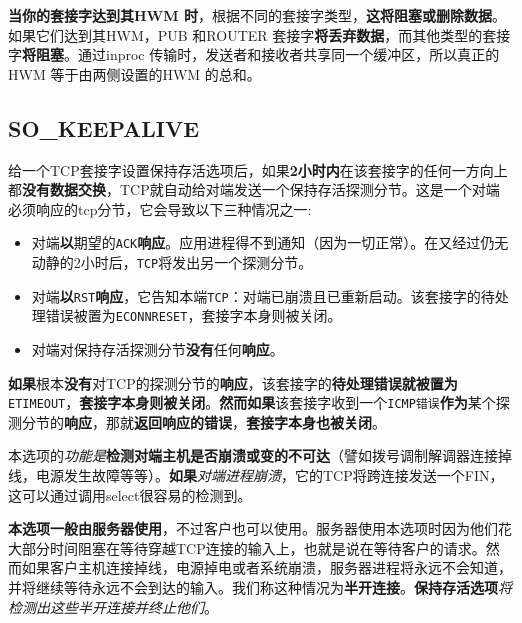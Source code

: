 \documentclass[UTF8,a4paper,8pt]{ctexbook}
\begin{document}
			\textbf{当你的套接字达到其HWM 时}，根据不同的套接字类型，\textbf{这将阻塞或删除数据}。如果它们达到其HWM，PUB 和ROUTER 套接字\textbf{将丢弃数据}，而其他类型的套接字\textbf{将阻塞}。通过inproc 传输时，发送者和接收者共享同一个缓冲区，所以真正的HWM 等于由两侧设置的HWM 的总和。
			
		\subsection{SO\_KEEPALIVE}			
		给一个TCP套接字设置保持存活选项后，如果\textbf{2小时内}在该套接字的任何一方向上都\textbf{没有数据交换}，TCP就自动给对端发送一个保持存活探测分节。这是一个对端必须响应的tcp分节，它会导致以下三种情况之一:
			\begin{itemize}
				\item 对端\textbf{以}期望的\verb|ACK|\textbf{响应}。应用进程得不到通知（因为一切正常）。在又经过仍无动静的2小时后，\verb|TCP|将发出另一个探测分节。
				\item 对端\textbf{以}\verb|RST|\textbf{响应}，它告知本端\verb|TCP|：对端已崩溃且已重新启动。该套接字的待处理错误被置为\verb|ECONNRESET|，套接字本身则被关闭。
				\item 对端对保持存活探测分节\textbf{没有}任何\textbf{响应}。
			\end{itemize}
			
			\textbf{如果}根本\textbf{没有}对TCP的探测分节的\textbf{响应}，该套接字的\textbf{待处理错误就被置为}\verb|ETIMEOUT|，\textbf{套接字本身则被关闭}。\textbf{然而如果}该套接字收到一个\verb|ICMP错误|\textbf{作为}某个探测分节的\textbf{响应}，那就\textbf{返回响应的错误}，\textbf{套接字本身也被关闭}。
			
			本选项的\textit{功能是}\textbf{检测对端主机是否崩溃或变的不可达}（譬如拨号调制解调器连接掉线，电源发生故障等等）。\textbf{如果}\textit{对端进程崩溃}，它的TCP将跨连接发送一个FIN，这可以通过调用select很容易的检测到。
			
			\textbf{本选项一般由服务器使用}，不过客户也可以使用。服务器使用本选项时因为他们花大部分时间阻塞在等待穿越TCP连接的输入上，也就是说在等待客户的请求。然而如果客户主机连接掉线，电源掉电或者系统崩溃，服务器进程将永远不会知道，并将继续等待永远不会到达的输入。我们称这种情况为\textbf{半开连接}。\textbf{保持存活选项}\textit{将检测出这些半开连接并终止他们}。
			
\end{document}
